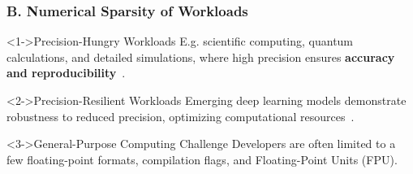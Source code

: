\begin{frame}
  \frametitle{B. Numerical Sparsity of Workloads}

    \begin{alertblock}<1->{Precision-Hungry Workloads}
	  E.g. scientific computing, quantum calculations, and detailed simulations, where high precision ensures \textbf{accuracy and reproducibility}~\cite{beliakov_parallel_2013,zhang_qed_1996,ellis_one-loop_2009,lake_sir_1996}.
    \end{alertblock}

    \begin{alertblock}<2->{Precision-Resilient Workloads}
        Emerging deep learning models demonstrate robustness to reduced precision, optimizing computational resources~\cite{johnson_rethinking_2018,courbariaux_binarized_2016}.
    \end{alertblock}

    \begin{block}<3->{General-Purpose Computing Challenge}
	    Developers are often limited to a few floating-point formats, compilation flags, and Floating-Point Units (FPU).
    \end{block}
\end{frame}

